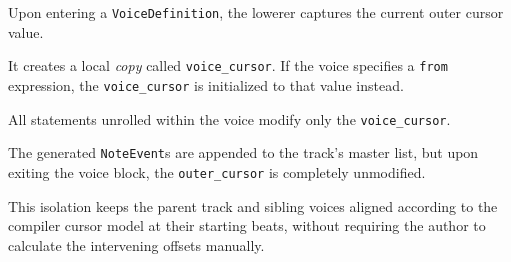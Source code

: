 \noindent Upon entering a \texttt{VoiceDefinition}, the lowerer captures the current outer cursor value.

\noindent It creates a local \textit{copy} called \texttt{voice\_cursor}.
If the voice specifies a \texttt{from} expression, the \texttt{voice\_cursor} is initialized to that value instead.

\noindent All statements unrolled within the voice modify only the \texttt{voice\_cursor}.

\noindent The generated \texttt{NoteEvent}s are appended to the track's master list, but upon exiting the
voice block, the
\texttt{outer\_cursor} is completely unmodified.

This isolation keeps the parent track and sibling voices aligned according to the compiler cursor model at
their starting beats, without requiring the author to calculate the intervening offsets manually.

